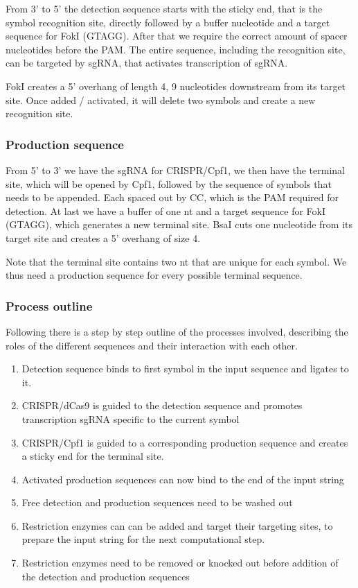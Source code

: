 \documentclass[
11pt, %
a4paper, %
oneside, %
headinclude,footinclude, %
BCOR5mm, %
]{scrartcl}
\begin{document}
From 3' to 5' the detection sequence starts with the sticky end, that is the
symbol recognition site, directly followed by a buffer nucleotide and a target
sequence for FokI (GTAGG). After that we require the correct amount of spacer
nucleotides before the PAM. The entire sequence, including the recognition site,
can be targeted by sgRNA, that activates transcription of sgRNA.

FokI creates a 5' overhang of length 4, 9 nucleotides downstream from its
target site. Once added / activated, it will delete two symbols and create a new
recognition site.

\subsubsection{Production sequence}

From 5' to 3' we have the sgRNA for CRISPR/Cpf1, we then have the terminal site,
which will be opened by Cpf1, followed by the sequence of symbols that needs to
be appended. Each spaced out by CC, which is the PAM required for detection. At
last we have a buffer of one nt and a target sequence for FokI (GTAGG), which
generates a new terminal site. BsaI cuts one nucleotide from its target site and
creates a 5' overhang of size 4.

Note that the terminal site contains two nt that are unique for each symbol. We
thus need a production sequence for every possible terminal sequence. 

\subsubsection{Process outline}

Following there is a step by step outline of the processes involved, describing
the roles of the different sequences and their interaction with each other.
\begin{enumerate}
  \item Detection sequence binds to first symbol in the input sequence and
    ligates to it.
  \item CRISPR/dCas9 is guided to the detection sequence and promotes
    transcription sgRNA specific to the current symbol
  \item CRISPR/Cpf1 is guided to a corresponding production sequence and creates
    a sticky end for the terminal site.
  \item Activated production sequences can now bind to the end of the input
    string
  \item Free detection and production sequences need to be washed out
  \item Restriction enzymes can can be added and target their targeting sites,
    to prepare the input string for the next computational step.
  \item Restriction enzymes need to be removed or knocked out before addition of
    the detection and production sequences
\end{enumerate}
\end{document}
